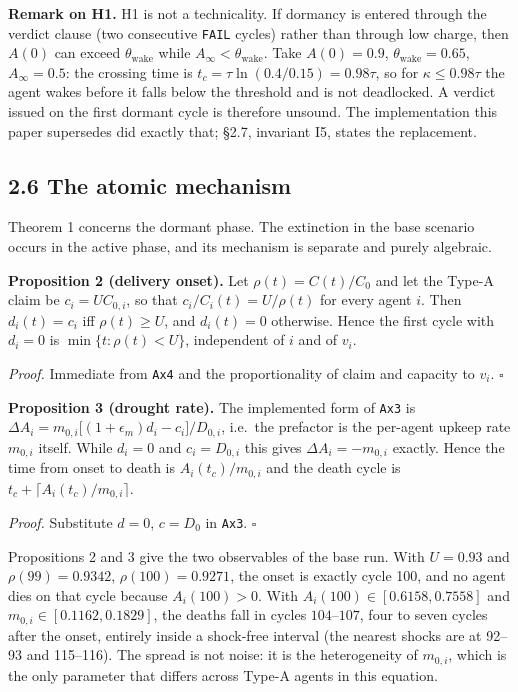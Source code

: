 \documentclass[11pt,a4paper]{article}
\begin{document}
\textbf{Remark on H1.} H1 is not a technicality. If dormancy is entered through the
verdict clause (two consecutive \texttt{FAIL} cycles) rather than through low charge,
then \(A(0)\) can exceed
\(\theta_{\mathrm{wake}}\) while \(A_\infty<\theta_{\mathrm{wake}}\). Take
\(A(0)=0.9\), \(\theta_{\mathrm{wake}}=0.65\), \(A_\infty=0.5\): the crossing time is
\(t_c=\tau\ln(0.4/0.15)=0.98\tau\), so for \(\kappa\le0.98\tau\) the agent wakes
before it falls below the threshold and is not deadlocked. A verdict issued on
the first dormant cycle is therefore unsound. The implementation this paper
supersedes did exactly that; §2.7, invariant I5, states the replacement.

\subsection{2.6 The atomic mechanism}\label{the-atomic-mechanism}

Theorem 1 concerns the dormant phase. The extinction in the base scenario occurs
in the active phase, and its mechanism is separate and purely algebraic.

\textbf{Proposition 2 (delivery onset).} Let \(\rho(t)=C(t)/C_0\) and let the Type-A
claim be \(c_i=U C_{0,i}\), so that \(c_i/C_i(t)=U/\rho(t)\) for every agent \(i\).
Then \(d_i(t)=c_i\) iff \(\rho(t)\ge U\), and \(d_i(t)=0\) otherwise. Hence the first
cycle with \(d_i=0\) is \(\min\{t:\rho(t)<U\}\), independent of \(i\) and of \(v_i\).

\emph{Proof.} Immediate from \texttt{Ax4} and the proportionality of claim and capacity to
\(v_i\). \(\square\)

\textbf{Proposition 3 (drought rate).} The implemented form of \texttt{Ax3} is
\(\Delta A_i=m_{0,i}\big[(1+\epsilon_m)d_i-c_i\big]/D_{0,i}\), i.e.~the prefactor is
the per-agent upkeep rate \(m_{0,i}\) itself. While \(d_i=0\) and \(c_i=D_{0,i}\) this gives
\(\Delta A_i=-m_{0,i}\) exactly. Hence the time from onset to death is
\(A_i(t_c)/m_{0,i}\) and the death cycle is \(t_c+\lceil A_i(t_c)/m_{0,i}\rceil\).

\emph{Proof.} Substitute \(d=0\), \(c=D_0\) in \texttt{Ax3}. \(\square\)

Propositions 2 and 3 give the two observables of the base run. With \(U=0.93\) and
\(\rho(99)=0.9342\), \(\rho(100)=0.9271\), the onset is exactly cycle 100, and no
agent dies on that cycle because \(A_i(100)>0\). With \(A_i(100)\in[0.6158,0.7558]\)
and \(m_{0,i}\in[0.1162,0.1829]\), the deaths fall in cycles \(104\)--\(107\), four to
seven cycles after the onset, entirely inside a shock-free interval (the nearest
shocks are at 92--93 and 115--116). The spread is not noise: it is the heterogeneity
of \(m_{0,i}\), which is the only parameter that differs across Type-A agents in this
equation.
\end{document}

